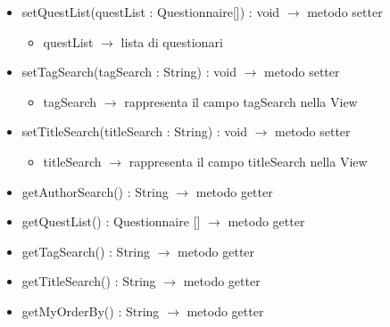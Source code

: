 \begin{description}
\begin{itemize}
	\item setQuestList(questList : Questionnaire[]) : void $\rightarrow$ metodo setter\begin{itemize}
		\item questList $\rightarrow$ lista di questionari
	\end{itemize}
	
	\item setTagSearch(tagSearch : String) : void $\rightarrow$ metodo setter\begin{itemize}
		\item tagSearch $\rightarrow$ rappresenta il campo tagSearch nella View
	\end{itemize}
	
	\item setTitleSearch(titleSearch : String) : void $\rightarrow$ metodo setter\begin{itemize}
		\item titleSearch $\rightarrow$ rappresenta il campo titleSearch nella View
	\end{itemize}
	
	\item getAuthorSearch() : String $\rightarrow$ metodo getter
	\item getQuestList() : Questionnaire [] $\rightarrow$ metodo getter
	\item getTagSearch() : String $\rightarrow$ metodo getter
	\item getTitleSearch() : String $\rightarrow$ metodo getter
	\item getMyOrderBy() : String $\rightarrow$ metodo getter
\end{itemize}

\end{description}

